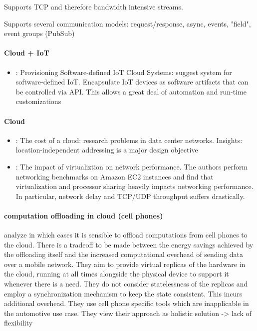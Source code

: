 Supports TCP and therefore bandwidth intensive streams.

Supports several communication models: request/response, async, events, "field", event groups (PubSub)

\paragraph{Cloud + IoT}

\begin{itemize}
	\item \cite{nastic2014provisioning}: Provisioning Software-defined IoT Cloud Systems: suggest system for software-defined IoT. Encapsulate IoT devices as software artifacts that can be controlled via API. This allows a great deal of automation and run-time customizations
\end{itemize}


\paragraph{Cloud}

\begin{itemize}
	\item \cite{greenberg2008cost}: The cost of a cloud: research problems in data center networks. Insights: location-independent addressing is a major design objective
	\item \cite{wang2010impact}: The impact of virtualiztion on network performance. The authors perform networking benchmarks on Amazon EC2 instances and find that virtualization and processor sharing heavily impacts networking performance. In particular, network delay and TCP/UDP throughput suffers drastically.
\end{itemize}

\paragraph{computation offloading in cloud (cell phones)}
\citeauthor*{barbera2013offload} \cite{barbera2013offload} analyze in which cases it is sensible to offload computations from cell phones to the cloud. There is a tradeoff to be made between the energy savings achieved by the offloading itself and the increased computational overhead of sending data over a mobile network. They aim to provide virtual replicas of the hardware in the cloud, running at all times alongside the physical device to support it whenever there is a need. They do not consider statelessness of the replicas and employ a synchronization mechanism to keep the state consistent. This incurs additional overhead. They use cell phone specific tools which are inapplicable in the automotive use case. They view their approach as holistic solution -> lack of flexibility

